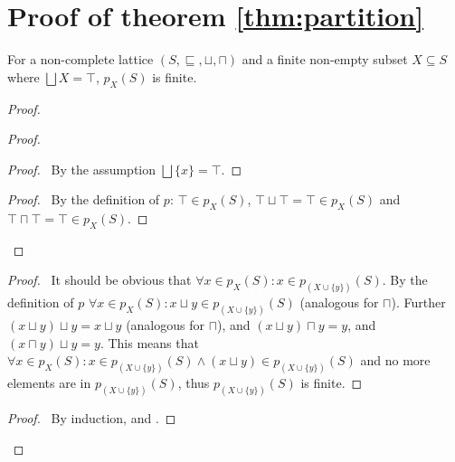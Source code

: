 
\section{Proof of theorem \ref{thm:partition}}

\begin{lemma}\label{lem:finite-partition}
    For a non-complete lattice $(S, \sqsubseteq, \sqcup, \sqcap)$ and a finite non-empty subset $X \subseteq S$ where $\bigsqcup X = \top$, $p_X(S)$ is finite.
\end{lemma}

\begin{proof}
    \pf\
    \begin{proof}
        \begin{proof}
            \pf\ By the assumption $\bigsqcup \{x\} = \top$.
        \end{proof}
        \begin{proof}
            \pf\ By the definition of $p$: $\top \in p_X(S)$, $\top \sqcup \top = \top \in p_X(S)$ and $\top \sqcap \top = \top \in p_X(S)$.
        \end{proof}
    \end{proof}
    \begin{proof}
        \pf\ It should be obvious that $\forall x \in p_X(S) : x \in p_{(X \cup \{y\})}(S)$.
        By the definition of $p$ $\forall x \in p_X(S) : x \sqcup y \in p_{(X \cup \{y\})}(S)$ (analogous for $\sqcap$).
        Further $(x \sqcup y) \sqcup y = x \sqcup y$ (analogous for $\sqcap$), and $(x \sqcup y) \sqcap y = y$, and $(x \sqcap y) \sqcup y = y$.
        This means that $\forall x \in p_X(S) : x \in p_{(X \cup \{y\})}(S) \land (x \sqcup y) \in p_{(X \cup \{y\})}(S)$ and no more elements are in $p_{(X \cup \{y\})}(S)$, thus $p_{(X \cup \{y\})}(S)$ is finite.
    \end{proof}
    \qedstep
    \begin{proof}
        \pf\ By induction,  and .
    \end{proof}
\end{proof}

\partition*

